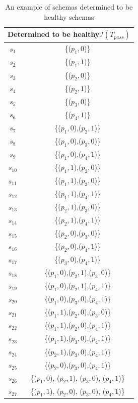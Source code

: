 \begin{table}[htbp]
  \centering
  \caption{An example of schemas determined to be healthy schemas}
  \label{ex:determinablehealthyschemas}
    \begin{tabular}{|c|c|} \hline
   \multicolumn{2}{|c|}{\textbf{ Determined to be healthy$\mathcal{I}(T_{pass})$ }}\\ \hline
   $s_{1}$ & \{($p_{1}, 0$)\} \\
   $s_{2}$ & \{($p_{1}, 1$)\} \\
   $s_{3}$ & \{($p_{2}, 0$)\} \\
   $s_{4}$ & \{($p_{2}, 1$)\} \\
   $s_{5}$ & \{($p_{3}, 0$)\} \\
   $s_{6}$ & \{($p_{4}, 1$)\} \\

   $s_{7}$ & \{($p_{1}, 0$),($p_{2}, 1$)\} \\
   $s_{8}$ & \{($p_{1}, 0$),($p_{3}, 0$)\} \\
   $s_{9}$ & \{($p_{1}, 0$),($p_{4}, 1$)\} \\
   $s_{10}$ & \{($p_{1}, 1$),($p_{2}, 0$)\} \\
   $s_{11}$ & \{($p_{1}, 1$),($p_{3}, 0$)\} \\
   $s_{12}$ & \{($p_{1}, 1$),($p_{4}, 1$)\} \\

   $s_{13}$ & \{($p_{2}, 1$),($p_{3}, 0$)\} \\
   $s_{14}$ & \{($p_{2}, 1$),($p_{4}, 1$)\} \\
   $s_{15}$ & \{($p_{2}, 0$),($p_{3}, 0$)\} \\
   $s_{16}$ & \{($p_{2}, 0$),($p_{4}, 1$)\} \\

   $s_{17}$ & \{($p_{3}, 0$),($p_{4}, 1$)\} \\

   $s_{18}$ & \{($p_{1}, 0$),($p_{2}, 1$),($p_{3}, 0$)\} \\
   $s_{19}$ & \{($p_{1}, 0$),($p_{2}, 1$),($p_{4}, 1$)\} \\
   $s_{20}$ & \{($p_{1}, 0$),($p_{3}, 0$),($p_{4}, 1$)\} \\

   $s_{21}$ & \{($p_{1}, 1$),($p_{2}, 0$),($p_{3}, 0$)\} \\
   $s_{22}$ & \{($p_{1}, 1$),($p_{2}, 0$),($p_{4}, 1$)\} \\
   $s_{23}$ & \{($p_{1}, 1$),($p_{3}, 0$),($p_{4}, 1$)\} \\

   $s_{24}$ & \{($p_{2}, 1$),($p_{3}, 0$),($p_{4}, 1$)\} \\
   $s_{25}$ & \{($p_{2}, 0$),($p_{3}, 0$),($p_{4}, 1$)\} \\

   $s_{26}$ & \{($p_{1}, 0$), ($p_{2}, 1$), ($p_{3}, 0$), ($p_{4}, 1$)\} \\
   $s_{27}$ & \{($p_{1}, 1$), ($p_{2}, 0$), ($p_{3}, 0$), ($p_{4}, 1$)\} \\ \hline
    \end{tabular}%
\end{table}



